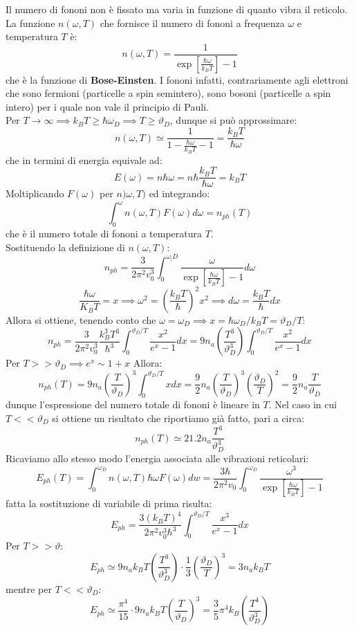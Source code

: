 \documentclass{book}
\begin{document}
            Il numero di fononi non è fissato ma varia in funzione di quanto vibra il reticolo. La funzione $n(\omega, T)$ che fornisce il numero di fononi a frequenza $\omega$ e temperatura $T$ è:
            $$n(\omega, T) = \frac{1}{\exp{[\frac{\hbar \omega}{k_{B}T}]}-1}$$
            che è la funzione di \textbf{Bose-Einsten}. I fononi infatti, contrariamente agli elettroni che sono fermioni (particelle a spin semintero), sono bosoni (particelle a spin intero) per i quale non vale il principio di Pauli.\\
            Per $T \to \infty \implies k_{B}T \geq \hbar \omega_{D} \implies T \geq \vartheta_{D}$, dunque si può approssimare:
            $$n(\omega, T) \simeq \frac{1}{1 - \frac{\hbar \omega}{k_{B}T} -1} = \frac{k_{B}T}{\hbar \omega}$$
            che in termini di energia equivale ad:
            $$E(\omega) = n \hbar \omega = n \hbar \frac{k_{B}T}{\hbar \omega} = k_{B}T$$
            Moltiplicando $F(\omega)$ per $n)\omega, T)$ ed integrando:
            $$\int_{0} ^{\omega} n(\omega, T) F(\omega) d \omega = n_{ph}(T)$$
            che è il numero totale di fononi a temperatura $T$.\\
            Sostituendo la definizione di $n(\omega, T)$:
            $$n_{ph} = \frac{3}{2 \pi^{2} v_{0} ^{3}} \int_{0} ^{\omega_[D} \frac{\omega}{\exp{[\frac{\hbar \omega}{k_{B}T}]}-1}d\omega$$
            $$\frac{\hbar \omega}{K_{B}T} = x \implies \omega^{2} = (\frac{k_{B}T}{\hbar})^{2}x^{2} \implies d \omega = \frac{k_{B}T}{\hbar} dx$$
            Allora si ottiene, tenendo conto che $\omega = \omega_{D} \implies x = \hbar \omega_{D}/k_{B}T = \vartheta_{D}/T$:
            $$n_{ph} = \frac{3}{2 \pi^{2}v_{0} ^{3}} \frac{k_{B} ^{3}T^{3}}{\hbar ^{3}} \int_{0} ^{\vartheta_{D}/T} \frac{x^{2}}{e^{x}-1}dx = 9n_{a}(\frac{T^{3}}{\vartheta_{D} ^{3}}) \int_{0} ^{\vartheta_{D}/T}  \frac{x^{2}}{e^{x}-1}dx$$
            Per $T >> \vartheta_{D} \implies e^{x} \sim 1+x$
            Allora:
            $$n_{ph}(T) = 9n_{a} (\frac{T}{\vartheta_{D}})^{3} \int_{0} ^{\vartheta_{D}/T} xdx = \frac{9}{2}n_{a} (\frac{T}{\vartheta_{D}})^{3}(\frac{\vartheta_{D}}{T})^{2} = \frac{9}{2} n_{a}\frac{T}{\vartheta_{D}}$$
            dunque l'espressione del numero totale di fononi è lineare in $T$.
            Nel caso in cui $T << \vartheta_{D}$ si ottiene un risultato che riportiamo già fatto, pari a circa:
            $$n_{ph}(T) \simeq 21.2n_{a}\frac{T^{3}}{\vartheta_{D} ^{3}}$$
            Ricaviamo allo stesso modo l'energia associata alle vibrazioni reticolari:
            $$E_{ph}(T) = \int_{0} ^{\omega_{D}} n(\omega, T) \hbar \omega F(\omega)dw = \frac{3 \hbar}{2 \pi^{2}v_{0}}\int_{0} ^{\omega_{D}} \frac{\omega ^{3}}{\exp{[\frac{\hbar \omega}{k_{B}T}]}-1}$$
            fatta la sostituzione di variabile di prima risulta:
            $$E_{ph} = \frac{3 (k_{B}T) ^{4}}{2 \pi^{2}v_{0}^{3}\hbar ^{3}} \int_{0} ^{\vartheta_{D}/T} \frac{x^{3}}{e^{x}-1} dx$$
            Per $T >> \vartheta$:
            $$E_{ph} \simeq 9n_{a} k_{B}T (\frac{T^{3}}{\vartheta_{D} ^{3}}) \cdot \frac{1}{3}(\frac{\vartheta_{D}}{T})^{3}= 3n_{a}k_{B}T$$
            mentre per $T<<\vartheta_{D}$:
            $$E_{ph} \simeq \frac{\pi^{4}}{15} \cdot 9n_{a}k_{B}T(\frac{T}{{\vartheta_{D}}})^{3} = \frac{3}{5}\pi^{4} k_{B}(\frac{T^{4}}{\vartheta_{D} ^{3}})$$
\end{document}
